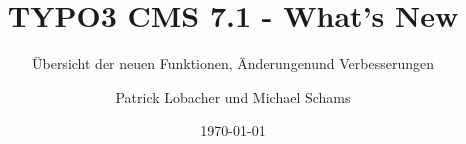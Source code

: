 %

%
%

\documentclass[t]{beamer}

\beamertemplatenavigationsymbolsempty

{
	\usetheme{typo3slides}
}

\title{TYPO3 CMS 7.1 - What's New}
\subtitle{Übersicht der neuen Funktionen, Änderungen\newline und Verbesserungen}
\author{
	\centerline{Patrick Lobacher und Michael Schams}
}

\date{\today}



\sharefont


\begingroup
	[default]
	\begin{frame}
		\titlepage
	\end{frame}
\endgroup


\section*{TYPO3 CMS 7.1 - What's New}
\begin{frame}[fragile]
	\frametitle{Kapitelübersicht}
	\framesubtitle{Kapitelübersicht}

	\begin{multicols}{2}
		\tableofcontents
	\end{multicols}

\end{frame}

